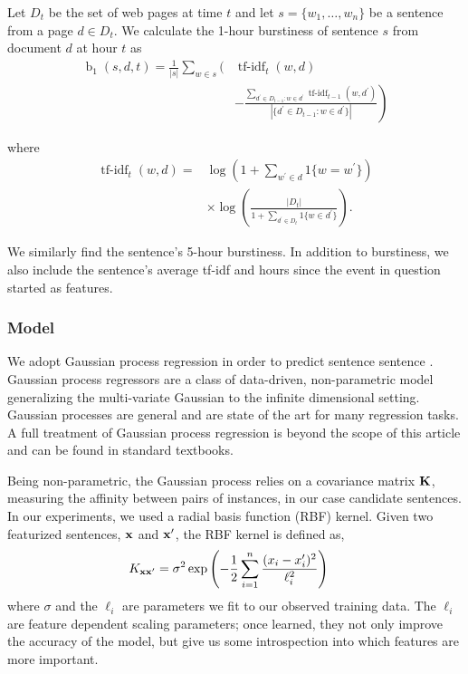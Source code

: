 Let $D_t$ be the set of web pages at time $t$ and let $s = \{w_1,\ldots,w_n\}$ be a sentence from a page $d \in D_t$.  We calculate the 1-hour burstiness of sentence $s$ from document $d$ at hour $t$  as 
\begin{align*}
\operatorname{b}_1(s,d,t) = \frac{1}{|s|} \sum_{w \in s} \Bigg( &
\operatorname{tf-idf}_t(w,d)  \\ & \left. - \frac{\sum_{d^\prime \in D_{t-1}:
w \in d^\prime } \operatorname{tf-idf}_{t-1}(w,d^\prime)}{|\{d^\prime \in
D_{t-1}: w \in d^\prime\}|} \right) \end{align*}

where \begin{align*} \operatorname{tf-idf}_t(w,d) =&
\log\left(1+\sum_{w^\prime \in d}1\{w=w^\prime\}  \right)\\ & \times
\log\left(\frac{|D_t|}{1 + \sum_{d^\prime \in D_t}1\{w \in d^\prime\}}\right).
\end{align*}


We similarly find the sentence's 5-hour burstiness.  In addition to burstiness, we also include the sentence's average tf-idf and hours since the event in question started as features.

\subsubsection{Model}
We adopt Gaussian process regression in order to predict sentence sentence \cite{rasmussen:gaussian-process-book}.  Gaussian process regressors are a class of data-driven, non-parametric model generalizing the multi-variate Gaussian to the infinite dimensional setting.  Gaussian processes are  general and are state of the art for many regression tasks.  A full treatment of Gaussian process regression is beyond the scope of this article and can be found in standard textbooks.  


Being non-parametric, the Gaussian process relies on a  covariance matrix $\mathbf{K}$, measuring the affinity between pairs of instances, in our case candidate sentences.  In our experiments, we used a radial basis function (RBF) kernel.  Given two featurized sentences, $\mathbf{x}$ and $\mathbf{x}^\prime$, the RBF kernel is defined as,
\begin{align*}
	K_{\mathbf{x}\mathbf{x}^\prime}&= \sigma^2 \exp\left(- \frac{1}{2} 
\sum_{i=1}^{n} \frac{ (x_{i}-x_{i}^\prime)^2}{\ell_i^2} \right)
\end{align*}
where $\sigma$ and the $\ell_i$ are parameters we fit to our observed training data. The $\ell_i$ are feature dependent scaling parameters; once learned, they not only improve the accuracy of the model, but give us some introspection  into which features are more important.


